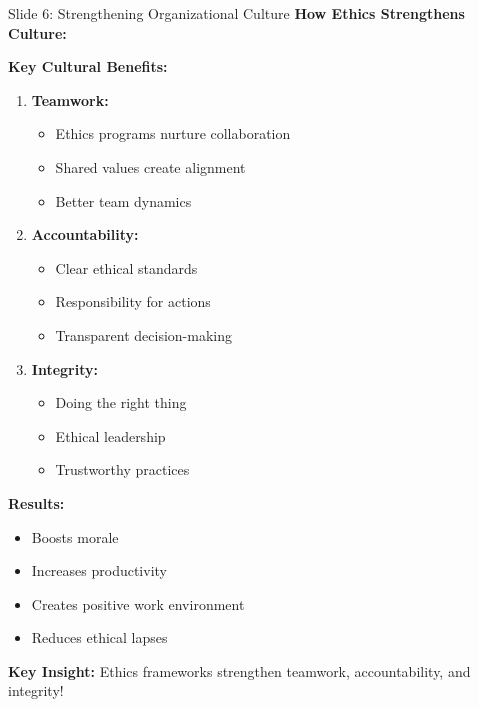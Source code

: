 \documentclass[8pt]{beamer}
\begin{document}
	\begin{frame}{Slide 6: Strengthening Organizational Culture}
		\fontsize{6.5}{7.5}\selectfont
		\textbf{How Ethics Strengthens Culture:}
		
		\vspace{0.1cm}
		\textbf{Key Cultural Benefits:}
		\begin{enumerate}
			\item \textbf{Teamwork:}
			\begin{itemize}
				\item Ethics programs nurture collaboration
				\item Shared values create alignment
				\item Better team dynamics
			\end{itemize}
			\item \textbf{Accountability:}
			\begin{itemize}
				\item Clear ethical standards
				\item Responsibility for actions
				\item Transparent decision-making
			\end{itemize}
			\item \textbf{Integrity:}
			\begin{itemize}
				\item Doing the right thing
				\item Ethical leadership
				\item Trustworthy practices
			\end{itemize}
		\end{enumerate}
		
		\vspace{0.1cm}
		\textbf{Results:}
		\begin{itemize}
			\item Boosts morale
			\item Increases productivity
			\item Creates positive work environment
			\item Reduces ethical lapses
		\end{itemize}
		
		\textcolor{myblue}{\textbf{Key Insight:}} Ethics frameworks strengthen \textcolor{myblue}{teamwork, accountability, and integrity}!
	\end{frame}
	
\end{document}
